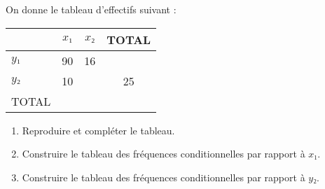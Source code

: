 \documentclass{beamer}
\begin{document}
\begin{frame}
	On donne le tableau d'effectifs suivant :
	\begin{center}
		\begin{tabular}{|l|c|c|c|}
			\hline
			\diagbox{$Y$}{$X$} & $x₁$ & $x₂$ & TOTAL \\ \hline
			$y₁$               & 90   & 16   &       \\ \hline
			$y₂$               & 10   &      & 25    \\ \hline
			TOTAL              &      &      &       \\ \hline
		\end{tabular}
	\end{center}

	\begin{enumerate}
		\item Reproduire et compléter le tableau.
		\item Construire le tableau des fréquences conditionnelles par rapport à $x₁$.
		\item Construire le tableau des fréquences conditionnelles par rapport à $y₂$.
	\end{enumerate}
\end{frame}
\end{document}
